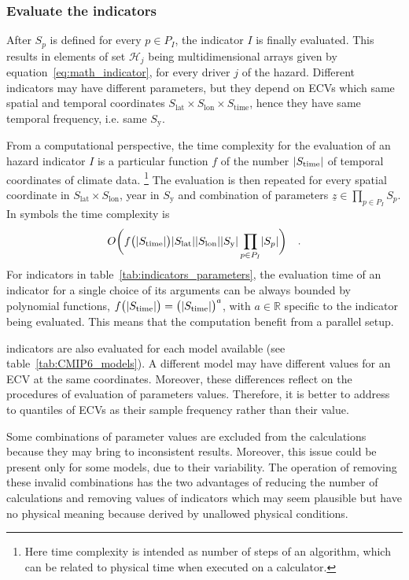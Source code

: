 \subsubsection{Evaluate the indicators}
After $S_p$ is defined for every $p \in P_I$, the \gls{indicator} $I$ is finally evaluated. This results in elements of set $\mathcal{H}_j$ being multidimensional arrays given by equation~\eqref{eq:math_indicator}, for every \gls{driver} $j$ of the \gls{hazard}. Different \glspl{indicator} may have different parameters, but they depend on \glspl{ECV} which same spatial and temporal coordinates $S_\text{lat} \times S_\text{lon} \times S_\text{time}$, hence they have same temporal frequency, i.e. same $S_\text{y}$.

From a computational perspective, the time complexity for the evaluation of an \gls{hazard} \gls{indicator} $I$ is a particular function $f$ of the number $\lvert S_\text{time}\rvert$ of temporal coordinates of climate data.%
\footnote{Here time complexity is intended as number of steps of an algorithm, which can be related to physical time when executed on a calculator.}
The evaluation is then repeated for every spatial coordinate in $S_\text{lat} \times S_\text{lon}$, year in $S_\text{y}$ and combination of parameters $\underline{z} \in \prod_{p \in P_I} S_p$. In symbols the time complexity is
\begin{equation}
  \label{eq:complexity_parameters}
  O \bigg( f \big( \lvert S_\text{time}\rvert \big) \lvert S_\text{lat}\rvert \lvert S_\text{lon}\rvert \lvert S_\text{y}\rvert \prod_{p \in P_I} \lvert S_p\rvert \bigg)
  \quad .
\end{equation}
For indicators in table~\ref{tab:indicators_parameters}, the evaluation time of an indicator for a single choice of its arguments can be always bounded by polynomial functions, $f \big( \lvert S_\text{time}\rvert \big) = \big( \lvert S_\text{time}\rvert \big)^a $, with $a \in \mathbb{R}$ specific to the indicator being evaluated. This means that the computation benefit from a parallel setup.

\Glspl{indicator} are also evaluated for each model available (see table~\ref{tab:CMIP6_models}). A different model may have different values for an \gls{ECV} at the same coordinates. Moreover, these differences reflect on the procedures of evaluation of parameters values. Therefore, it is better to address to quantiles of \glspl{ECV} as their sample frequency rather than their value.

Some combinations of parameter values are excluded from the calculations because they may bring to inconsistent results. Moreover, this issue could be present only for some models, due to their variability. The operation of removing these invalid combinations has the two advantages of reducing the number of calculations and removing values of indicators which may seem plausible but have no physical meaning because derived by unallowed physical conditions.


